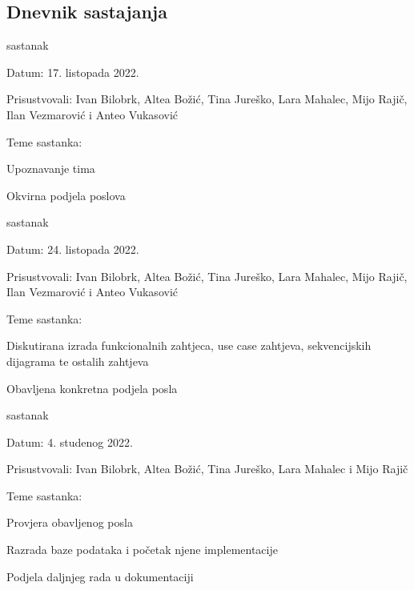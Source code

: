 \documentclass{article}
\begin{document}
	\subsection{Dnevnik sastajanja}
	\begin{packed_enum}
		\item sastanak
		
		\item[] \begin{packed_item}
			\item Datum: 17. listopada 2022.
			\item Prisustvovali: Ivan Bilobrk, Altea Božić, Tina Jureško, Lara Mahalec, Mijo Rajič, Ilan Vezmarović i Anteo Vukasović
			\item Teme sastanka:
			\begin{packed_item}
				\item  Upoznavanje tima
				\item  Okvirna podjela poslova
			\end{packed_item}
		\end{packed_item}
		
		\item sastanak
		\item[] \begin{packed_item}
			\item Datum: 24. listopada 2022. 
			\item Prisustvovali:  Ivan Bilobrk, Altea Božić, Tina Jureško, Lara Mahalec, Mijo Rajič, Ilan Vezmarović i Anteo Vukasović
			\item Teme sastanka:
			\begin{packed_item}
				\item  Diskutirana izrada funkcionalnih zahtjeca, use case zahtjeva, sekvencijskih dijagrama te ostalih zahtjeva
				\item  Obavljena konkretna podjela posla
			\end{packed_item}
		\end{packed_item}
	
		\item sastanak
		\item[] \begin{packed_item}
		\item Datum: 4. studenog 2022. 
		\item Prisustvovali:  Ivan Bilobrk, Altea Božić, Tina Jureško, Lara Mahalec i Mijo Rajič
		\item Teme sastanka:
		\begin{packed_item}
			\item  Provjera obavljenog posla
			\item  Razrada baze podataka i početak njene implementacije
			\item  Podjela daljnjeg rada u dokumentaciji
		\end{packed_item}
	\end{packed_item}


\end{packed_enum}
\end{document}
